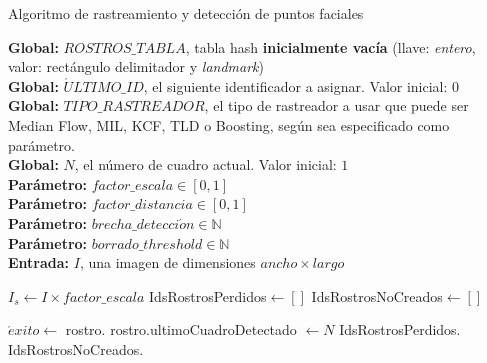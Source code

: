 \documentclass[a4paper,openright,12pt]{report}
\renewcommand{\algorithmicrequire}{\textbf{Entrada: }}
\begin{document}
\begin{algorithm}
  \caption{Algoritmo de rastreamiento y detección de puntos faciales}
  \label{alg:tracking}
  \textbf{Global: }$ROSTROS\_TABLA$, tabla hash \textbf{inicialmente vacía}
      (llave: \textit{entero}, valor: rectángulo delimitador y \textit{landmark})\\
  \textbf{Global: }$\acute{U}LTIMO\_ID$, el siguiente identificador a asignar. Valor inicial: $0$\\
  \textbf{Global: }$TIPO\_RASTREADOR$, el tipo de rastreador a usar que puede
                                       ser Median Flow, MIL, KCF, TLD o
                                       Boosting, según sea especificado como
                                        parámetro.\\
  \textbf{Global: }$N$, el número de cuadro actual. Valor inicial: $1$\\
  \textbf{Parámetro: }$factor\_escala \in [0, 1]$\\
  \textbf{Parámetro: }$factor\_distancia \in [0, 1]$\\
  \textbf{Parámetro: }$brecha\_detecci\acute on \in \mathbb{N}$\\
  \textbf{Parámetro: }$borrado\_threshold \in \mathbb{N}$\\
  \algorithmicrequire{$I$, una imagen de dimensiones $ancho \times largo$}\\
  \begin{algorithmic}[1]

      \State $I_{s}\leftarrow I \times factor\_escala$ 
      \State IdsRostrosPerdidos$\leftarrow []$ \label{lst:line:A}
      \State IdsRostrosNoCreados$\gets []$ 

      \State {}
      \label{lst:line:initBefDetect}
      \label{lst:line:faseDetec}
        \State $\acute{e}xito \gets$ rostro.
        \label{lst:line:rastrear}
          \State rostro.ultimoCuadroDetectado $\gets N$
          \label{lst:line:rastrearActualizarUltimoFrame}
        \Else
          \State IdsRostrosPerdidos. \label{lst:line:objetivoPerdido}
          \label{lst:line:registrarPerdidos}
        \EndIf
          \State IdsRostrosNoCreados.
      \EndFor \label{lst:line:B}
      \label{lst:line:endBefDetect}


\end{algorithmic}
\end{algorithm}
\end{document}

